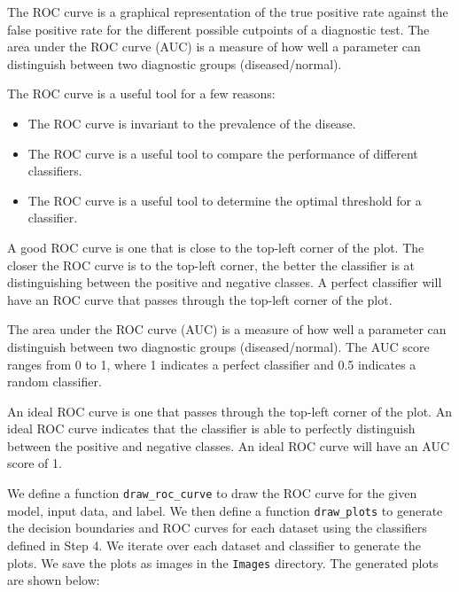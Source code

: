 \clearpage

\begin{definition*}
    The ROC curve is a graphical representation of the true positive rate against the false positive rate for the different possible cutpoints of a diagnostic test. The area under the ROC curve (AUC) is a measure of how well a parameter can distinguish between two diagnostic groups (diseased/normal).

    The ROC curve is a useful tool for a few reasons:
    \begin{itemize}
        \item The ROC curve is invariant to the prevalence of the disease.
        \item The ROC curve is a useful tool to compare the performance of different classifiers.
        \item The ROC curve is a useful tool to determine the optimal threshold for a classifier.
    \end{itemize}
\end{definition*}

\begin{definition*}
    A good ROC curve is one that is close to the top-left corner of the plot. The closer the ROC curve is to the top-left corner, the better the classifier is at distinguishing between the positive and negative classes. A perfect classifier will have an ROC curve that passes through the top-left corner of the plot.

    The area under the ROC curve (AUC) is a measure of how well a parameter can distinguish between two diagnostic groups (diseased/normal). The AUC score ranges from 0 to 1, where 1 indicates a perfect classifier and 0.5 indicates a random classifier.
\end{definition*}

\begin{definition*}
    An ideal ROC curve is one that passes through the top-left corner of the plot. An ideal ROC curve indicates that the classifier is able to perfectly distinguish between the positive and negative classes. An ideal ROC curve will have an AUC score of 1.
\end{definition*}

We define a function \texttt{draw\_roc\_curve} to draw the ROC curve for the given model, input data, and label. We then define a function \texttt{draw\_plots} to generate the decision boundaries and ROC curves for each dataset using the classifiers defined in Step 4. We iterate over each dataset and classifier to generate the plots. We save the plots as images in the \texttt{Images} directory. The generated plots are shown below:

